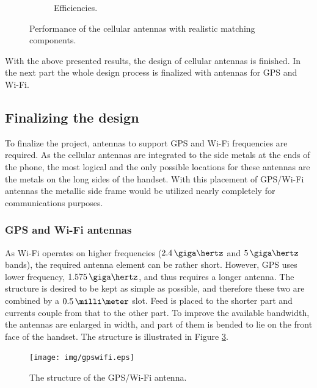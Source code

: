 \begin{figure}[H]
\begin{subfigure}[b]{0.49\textwidth}
        \caption{Efficiencies.}
        \label{fig:div_eff_real}
    \end{subfigure}
    \caption{Performance of the cellular antennas with realistic matching components.}
    \label{fig:div_real}
\end{figure}

With the above presented results, the design of cellular antennas is finished. In the next part the whole design process is finalized with antennas for GPS and Wi-Fi.

\subsection{Finalizing the design}
\label{sec:sim_final}

To finalize the project, antennas to support GPS and Wi-Fi frequencies are required. As the cellular antennas are integrated to the side metals at the ends of the phone, the most logical and the only possible locations for these antennas are the metals on the long sides of the handset. With this placement of GPS/Wi-Fi antennas the metallic side frame would be utilized nearly completely for communications purposes.


\subsubsection{GPS and Wi-Fi antennas}
\label{sec:gpswifi}
As Wi-Fi operates on higher frequencies ($2.4\,\giga\hertz$ and $5\,\giga\hertz$ bands), the required antenna element can be rather short. However, GPS uses lower frequency, $1.575\,\giga\hertz$, and thus requires a longer antenna. The structure is desired to be kept as simple as possible, and therefore these two are combined by a $0.5\,\milli\meter$ slot. Feed is placed to the shorter part and currents couple from that to the other part. To improve the available bandwidth, the antennas are enlarged in width, and part of them is bended to lie on the front face of the handset. The structure is illustrated in Figure \ref{fig:gps_struct}.
\begin{figure}[H]
    \centering
    \texttt{[image: img/gpswifi.eps]}
    \caption{The structure of the GPS/Wi-Fi antenna.}
    \label{fig:gps_struct}
\end{figure}

